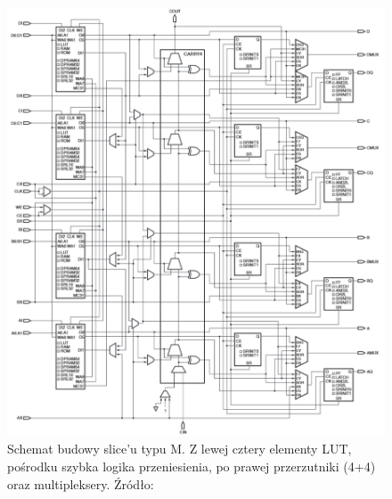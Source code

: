 \begin{figure}[!htb]
\label{fig:fpga_slice}
\centerline{\includegraphics[width=12cm]{introduction/images/fpga_slice}}
\caption{Schemat budowy slice'u typu M.  Z lewej cztery elementy LUT, pośrodku szybka logika przeniesienia, po prawej przerzutniki (4+4) oraz multipleksery. Źródło: \cite{xilix_sp6ugCLB}}
\end{figure}


